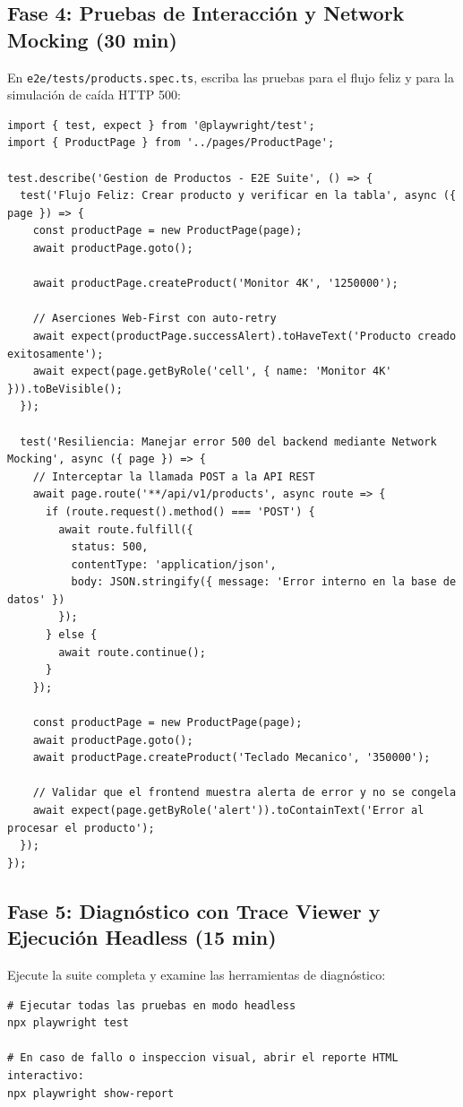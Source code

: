 \documentclass[10pt,letterpaper]{article}
\begin{document}
\subsection{Fase 4: Pruebas de Interacción y Network Mocking (30 min)}
En \texttt{e2e/tests/products.spec.ts}, escriba las pruebas para el flujo feliz y para la simulación de caída HTTP 500:
\begin{lstlisting}[style=codeStyle]
import { test, expect } from '@playwright/test';
import { ProductPage } from '../pages/ProductPage';

test.describe('Gestion de Productos - E2E Suite', () => {
  test('Flujo Feliz: Crear producto y verificar en la tabla', async ({ page }) => {
    const productPage = new ProductPage(page);
    await productPage.goto();

    await productPage.createProduct('Monitor 4K', '1250000');

    // Aserciones Web-First con auto-retry
    await expect(productPage.successAlert).toHaveText('Producto creado exitosamente');
    await expect(page.getByRole('cell', { name: 'Monitor 4K' })).toBeVisible();
  });

  test('Resiliencia: Manejar error 500 del backend mediante Network Mocking', async ({ page }) => {
    // Interceptar la llamada POST a la API REST
    await page.route('**/api/v1/products', async route => {
      if (route.request().method() === 'POST') {
        await route.fulfill({
          status: 500,
          contentType: 'application/json',
          body: JSON.stringify({ message: 'Error interno en la base de datos' })
        });
      } else {
        await route.continue();
      }
    });

    const productPage = new ProductPage(page);
    await productPage.goto();
    await productPage.createProduct('Teclado Mecanico', '350000');

    // Validar que el frontend muestra alerta de error y no se congela
    await expect(page.getByRole('alert')).toContainText('Error al procesar el producto');
  });
});
\end{lstlisting}

\subsection{Fase 5: Diagnóstico con Trace Viewer y Ejecución Headless (15 min)}
Ejecute la suite completa y examine las herramientas de diagnóstico:
\begin{lstlisting}[style=bashstyle]
# Ejecutar todas las pruebas en modo headless
npx playwright test

# En caso de fallo o inspeccion visual, abrir el reporte HTML interactivo:
npx playwright show-report
\end{lstlisting}
\end{document}
